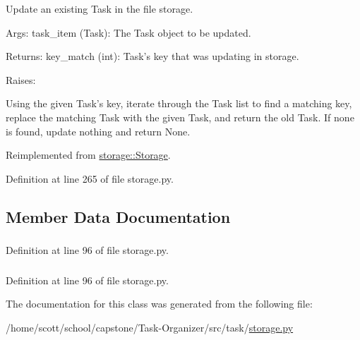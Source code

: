 \-Update an existing \-Task in the file storage. 

\-Args\-: task\-\_\-item (\-Task)\-: \-The \-Task object to be updated.

\-Returns\-: key\-\_\-match (int)\-: \-Task's key that was updating in storage.

\-Raises\-:

\-Using the given \-Task's key, iterate through the \-Task list to find a matching key, replace the matching \-Task with the given \-Task, and return the old \-Task. \-If none is found, update nothing and return \-None. 

\-Reimplemented from \hyperlink{classstorage_1_1Storage_ae0ed2cc07e30a6f350a750c7428061e9}{storage\-::\-Storage}.



\-Definition at line 265 of file storage.\-py.



\subsection{\-Member \-Data \-Documentation}
\hypertarget{classstorage_1_1FileStorage_a70122293a571deb852cdc8cf4800b0ac}{
\subsubsection[{key\-\_\-filename}]{}}
\label{classstorage_1_1FileStorage_a70122293a571deb852cdc8cf4800b0ac}


\-Definition at line 96 of file storage.\-py.

\hypertarget{classstorage_1_1FileStorage_a2a9a008a5ed06e3df5b5e45a3ff3d8e8}{
\subsubsection[{task\-\_\-filename}]{}}
\label{classstorage_1_1FileStorage_a2a9a008a5ed06e3df5b5e45a3ff3d8e8}


\-Definition at line 96 of file storage.\-py.



\-The documentation for this class was generated from the following file\-:\begin{DoxyCompactItemize}
\item 
/home/scott/school/capstone/\-Task-\/\-Organizer/src/task/\hyperlink{storage_8py}{storage.\-py}\end{DoxyCompactItemize}
